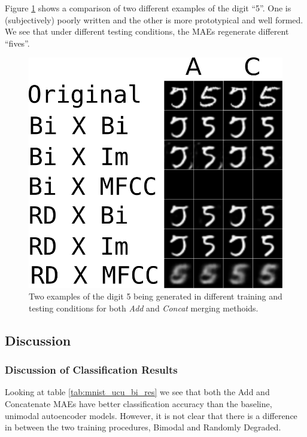 Figure \ref{fig:5s} shows a comparison of two different examples of the digit ``5''. One is (subjectively) poorly written and the other is more prototypical and well formed. We see that under different testing conditions, the MAEs regenerate different ``fives''.
\begin{figure}[h]
\begin{center}
	\includegraphics{Figs/mnistSpoken/5s.png}
	\caption{Two examples of the digit 5 being generated in different training and testing conditions for both \textit{Add} and \textit{Concat} merging methoids.}
	\label{fig:5s}
\end{center}
\end{figure}



\subsection{Discussion}

\subsubsection{Discussion of Classification Results}
Looking at table \ref{tab:mnist_ucu_bi_res} we see that both the Add and Concatenate MAEs have better classification accuracy than the baseline, unimodal autoencoder models. However, it is not clear that there is a difference in between the two training procedures, Bimodal and Randomly Degraded.

